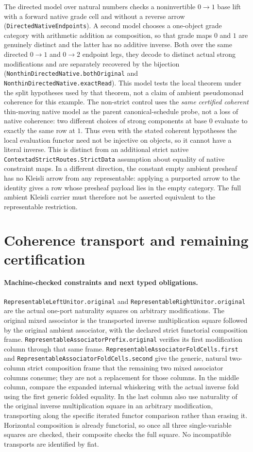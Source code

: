 \documentclass[11pt]{article}
\newcommand{\code}[1]{\nolinkurl{#1}}
\begin{document}
The directed model over natural numbers checks a noninvertible $0\to1$ base lift with a forward native grade cell and without a reverse arrow (\code{DirectedNativeEndpoints}). A second model chooses a one-object grade category with arithmetic addition as composition, so that grade maps $0$ and $1$ are genuinely distinct and the latter has no additive inverse. Both over the same directed $0\to1$ and $0\to2$ endpoint legs, they decode to distinct actual strong modifications and are separately recovered by the bijection (\code{NonthinDirectedNative.bothOriginal} and \code{NonthinDirectedNative.exactRead}). This model tests the local theorem under the split hypotheses used by that theorem, not a claim of ambient pseudomonad coherence for this example. The non-strict control uses the \emph{same certified coherent} thin-moving native model as the parent canonical-schedule probe, not a loss of native coherence: two different choices of strong components at base $0$ evaluate to exactly the same row at $1$. Thus even with the stated coherent hypotheses the local evaluation functor need not be injective on objects, so it cannot have a literal inverse. This is distinct from an additional strict native \code{ContextadStrictRoutes.StrictData} assumption about equality of native constraint maps. In a different direction, the constant empty ambient presheaf has no Kleisli arrow from any representable: applying a purported arrow to the identity gives a row whose presheaf payload lies in the empty category. The full ambient Kleisli carrier must therefore not be asserted equivalent to the representable restriction.

\section*{Coherence transport and remaining certification}
\paragraph{Machine-checked constraints and next typed obligations.}
\code{RepresentableLeftUnitor.original} and \code{RepresentableRightUnitor.original} are the actual one-port naturality squares on arbitrary modifications. The original mixed associator is the transported inverse multiplication square followed by the original ambient associator, with the declared strict functorial composition frame. \code{RepresentableAssociatorPrefix.original} verifies its first modification column through that same frame. \code{RepresentableAssociatorFoldCells.first} and \code{RepresentableAssociatorFoldCells.second} give the generic, natural two-column strict composition frame that the remaining two mixed associator columns consume; they are not a replacement for those columns. In the middle column, compare the expanded internal whiskering with the actual inverse fold using the first generic folded equality. In the last column also use naturality of the original inverse multiplication square in an arbitrary modification, transporting along the specific iterated functor comparison rather than erasing it. Horizontal composition is already functorial, so once all three single-variable squares are checked, their composite checks the full square. No incompatible transports are identified by fiat.
\end{document}
